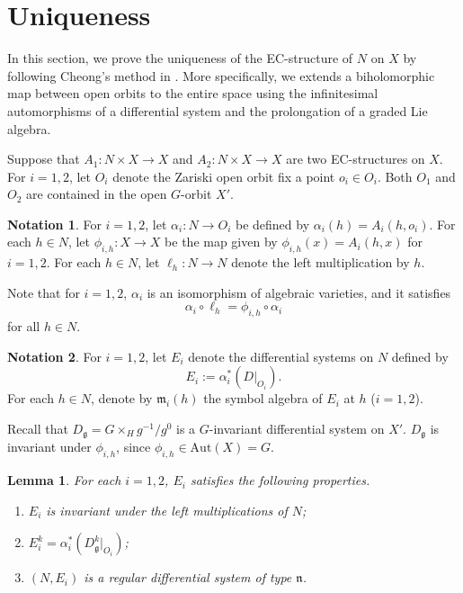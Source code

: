 \documentclass{amsart}
\newtheorem{lemma}[theorem]{Lemma}
\theoremstyle{definition}
\newtheorem{notation}{Notation}
\theoremstyle{remark}
\newcommand{\g}{\mathfrak{g}}
\newcommand{\m}{\mathfrak{m}}
\newcommand{\n}{\mathfrak{n}}
\begin{document}
\section{Uniqueness}
In this section, we prove the uniqueness of the EC-structure of $N$ on \(X\) by following Cheong's method in \cite{C}. More specifically, we extends a biholomorphic map between open orbits to the entire space using the infinitesimal automorphisms of a differential system and the prolongation of a graded Lie algebra.


Suppose that \(A_1 : N \times X \to X\) and \(A_2 : N \times X\to X\) are two EC-structures on \(X\). For \(i=1,2\), let \(O_i\) denote the Zariski open orbit fix a point \(o_i \in O_i\). Both \(O_1\) and \(O_2\) are contained in the open \(G\)-orbit \(X'\).


\begin{notation}
For $i=1, 2$, let $\alpha_i : N \to O_i$ be defined by $\alpha_i(h) = A_i(h, o_i)$. For each $h \in N$, let $\phi_{i, h} : X \to X$ be the map given by $\phi_{i,h} (x) = A_i(h, x)$ for $i = 1,2$. For each $h \in N$, let $\ell_h : N \to N$ denote the left multiplication by $h$.
\end{notation}

Note that for $i=1,2$, $\alpha_i$ is an isomorphism of algebraic varieties, and it satisfies 
\[\alpha_i \circ \ell_h = \phi_{i,h} \circ \alpha_i\]
for all $h \in N$.

\begin{notation}
For $i=1,2$, let $E_i$ denote the differential systems on $N$ defined by 
\[E_i := \alpha_i^*(D|_{O_i}).\]
For each $h \in N$, denote by $\m_i(h)$ the symbol algebra of $E_i$ at $h$ ($i=1,2$).
\end{notation}


Recall that $D_\g = G \times_H g^{-1}/g^0$ is a $G$-invariant differential system on $X'$. $D_\g$ is invariant under $\phi_{i,h}$, since $\phi_{i,h} \in \mathrm{Aut}(X) = G$. 


\begin{lemma}
\label{differential system}
For each $i=1, 2$, $E_i$ satisfies the following properties.
\begin{enumerate}[label = (\arabic*)]
    \item \(E_i\) is invariant under the left multiplications of $N$;
    \item $E_i^k = \alpha_i^*(D_\g^k|_{O_i})$;
    \item $(N, E_i)$ is a regular differential system of type $\n$.
\end{enumerate}
\end{lemma}
\end{document}
